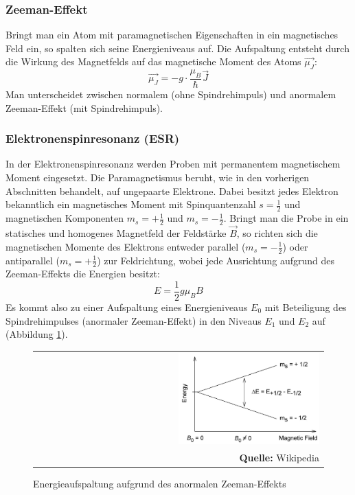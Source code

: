 \documentclass[a4paper,titlepage]{scrartcl}
\numberwithin{equation}{section}
\begin{document}
\subsubsection{Zeeman-Effekt \cite{wiki:zeeman}}
Bringt man ein Atom mit paramagnetischen Eigenschaften in ein magnetisches Feld ein, so spalten sich seine Energieniveaus auf. Die Aufspaltung entsteht durch die Wirkung des Magnetfelds auf das magnetische Moment des Atoms $\vec{\mu_J}$:
\begin{equation*}
\vec{\mu_J}=-g \cdot \frac{\mu_B}{\hbar} \vec{J}
\end{equation*}
Man unterscheidet zwischen normalem (ohne Spindrehimpuls) und anormalem Zeeman-Effekt (mit Spindrehimpuls).
\subsubsection{Elektronenspinresonanz (ESR)}
In der Elektronenspinresonanz werden Proben mit permanentem magnetischem Moment eingesetzt. Die Paramagnetismus beruht, wie in den vorherigen Abschnitten behandelt, auf ungepaarte Elektrone. Dabei besitzt jedes Elektron bekanntlich ein magnetisches Moment mit Spinquantenzahl $s=\frac{1}{2}$ und magnetischen Komponenten $m_s=+ \frac{1}{2}$ und $m_s=-\frac{1}{2}$. Bringt man die Probe in ein statisches und homogenes Magnetfeld der Feldstärke $\vec{B}$, so richten sich die magnetischen Momente des Elektrons entweder parallel ($m_s=-\frac{1}{2}$) oder antiparallel ($m_s=+\frac{1}{2}$) zur Feldrichtung, wobei jede Ausrichtung aufgrund des Zeeman-Effekts die Energien besitzt:
\begin{equation*}
E=\frac{1}{2}g\mu_B B
\end{equation*}
Es kommt also zu einer Aufspaltung eines Energieniveaus $E_0$ mit Beteiligung des Spindrehimpulses (anormaler Zeeman-Effekt) in den Niveaus $E_1$ und $E_2$ auf (Abbildung \ref{fig:aufspaltung}).
\begin{figure}[H]
	\centering
	\begin{tabular}{@{}r@{}}
		\includegraphics[width=0.5\textwidth]{EPR_splitting.jpg}\\
		\footnotesize\sffamily\textbf{Quelle:} Wikipedia \cite{wiki:epr}
	\end{tabular}
	\caption{Energieaufspaltung aufgrund des anormalen Zeeman-Effekts}
    \label{fig:aufspaltung}
\end{figure}
\end{document}
